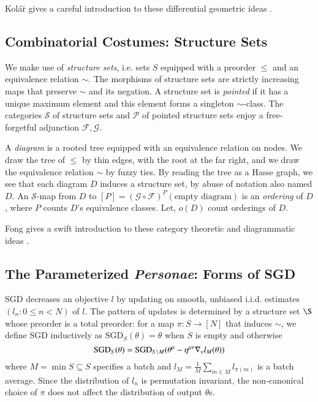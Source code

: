 \documentclass{article}
\newcommand{\Free}{\mathcal{F}}
\newcommand{\Forg}{\mathcal{G}}
\newcommand{\Ss}{\mathcal{S}}
\newcommand{\Pp}{\mathcal{P}}
\newcommand{\SGD}{\text{\textnormal{SGD}}}
\begin{document}
    Kol\'{a}\u{r} gives a careful introduction to these differential geometric
    ideas .

\subsection{Combinatorial Costumes: Structure Sets}
    We make use of \emph{structure sets}, i.e.  sets $S$ equipped with a
    preorder $\leq$ and an equivalence relation $\sim$.  The morphisms of
    structure sets are strictly increasing maps that preserve $\sim$ and its
    negation.  A structure set is \emph{pointed} if it has a unique maximum
    element and this element forms a singleton $\sim$-class.  The categories
    $\Ss$ of structure sets and $\Pp$ of pointed structure sets enjoy a
    free-forgetful adjunction $\Free, \Forg$.

    A \emph{diagram} is a rooted tree equipped with an equivalence relation on
    nodes.  We draw the tree of $\leq$ by thin edges, with the root at the far
    right, and we draw the equivalence relation $\sim$ by fuzzy ties.  By
    reading the tree as a Hasse graph, we see that each diagram $D$ induces a
    structure set, by abuse of notation also named $D$.  An $\Ss$-map from $D$
    to $[P]=(\Forg\circ\Free)^P(\text{empty diagram})$ is an \emph{ordering} of
    $D$, where $P$ counts $D$'s equivalence classes.
    Let, $o(D)$ count orderings of $D$.

    Fong gives a swift introduction to these category theoretic and
    diagrammatic ideas .
        
\subsection{The Parameterized \emph{Personae}: Forms of SGD}
    SGD decreases an objective $l$ by updating on smooth, unbiased i.i.d.
    estimates $(l_n: 0\leq n<N)$ of $l$.  The pattern of updates is determined
    by a structure set $\S$ whose preorder is a total preorder: for a map $\pi:S\to
    [N]$ that induces $\sim$, we define SGD inductively as
    $\text{SGD}_{S}(\theta) = \theta$ when $S$ is empty and otherwise
    $$
        \SGD_S(\theta) =
            \SGD_{S\setminus M}(\theta^\mu - \eta^{\mu\nu} \nabla_\nu l_{M}(\theta))
    $$
    where $M = \min S \subseteq S$ specifies a batch and $l_M =
    \frac{1}{M} \sum_{m\in M} l_{\pi(m)}$ is a batch average.  Since the
    distribution of $l_n$ is permutation invariant, the non-canonical choice
    of $\pi$ does not affect the distribution of output $\theta$s.
\end{document}
